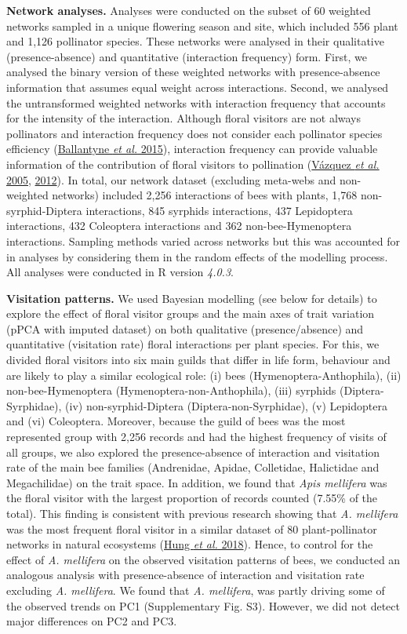 \documentclass[
  12pt,
  a4paper,
]{article}
\begin{document}
\textbf{Network analyses.} Analyses were conducted on the subset of 60 weighted networks sampled in a unique flowering season and site, which included 556 plant and 1,126 pollinator species. These networks were analysed in their qualitative (presence-absence) and quantitative (interaction frequency) form. First, we analysed the binary version of these weighted networks with presence-absence information that assumes equal weight across interactions. Second, we analysed the untransformed weighted networks with interaction frequency that accounts for the intensity of the interaction. Although floral visitors are not always pollinators and interaction frequency does not consider each pollinator species efficiency (\protect\hyperlink{ref-ballantyne2015}{Ballantyne \emph{et al.} 2015}), interaction frequency can provide valuable information of the contribution of floral visitors to pollination (\protect\hyperlink{ref-vazquez2005}{Vázquez \emph{et al.} 2005}, \protect\hyperlink{ref-vazquez2012}{2012}). In total, our network dataset (excluding meta-webs and non-weighted networks) included 2,256 interactions of bees with plants, 1,768 non-syrphid-Diptera interactions, 845 syrphids interactions, 437 Lepidoptera interactions, 432 Coleoptera interactions and 362 non-bee-Hymenoptera interactions. Sampling methods varied across networks but this was accounted for in analyses by considering them in the random effects of the modelling process. All analyses were conducted in R version \emph{4.0.3}.

\textbf{Visitation patterns.} We used Bayesian modelling (see below for details) to explore the effect of floral visitor groups and the main axes of trait variation (pPCA with imputed dataset) on both qualitative (presence/absence) and quantitative (visitation rate) floral interactions per plant species. For this, we divided floral visitors into six main guilds that differ in life form, behaviour and are likely to play a similar ecological role: (i) bees (Hymenoptera-Anthophila), (ii) non-bee-Hymenoptera (Hymenoptera-non-Anthophila), (iii) syrphids (Diptera-Syrphidae), (iv) non-syrphid-Diptera (Diptera-non-Syrphidae), (v) Lepidoptera and (vi) Coleoptera. Moreover, because the guild of bees was the most represented group with 2,256 records and had the highest frequency of visits of all groups, we also explored the presence-absence of interaction and visitation rate of the main bee families (Andrenidae, Apidae, Colletidae, Halictidae and Megachilidae) on the trait space. In addition, we found that \emph{Apis mellifera} was the floral visitor with the largest proportion of records counted (7.55\% of the total). This finding is consistent with previous research showing that \emph{A. mellifera} was the most frequent floral visitor in a similar dataset of 80 plant-pollinator networks in natural ecosystems (\protect\hyperlink{ref-hung2018}{Hung \emph{et al.} 2018}). Hence, to control for the effect of \emph{A. mellifera} on the observed visitation patterns of bees, we conducted an analogous analysis with presence-absence of interaction and visitation rate excluding \emph{A. mellifera}. We found that \emph{A. mellifera}, was partly driving some of the observed trends on PC1 (Supplementary Fig. S3). However, we did not detect major differences on PC2 and PC3.
\end{document}
